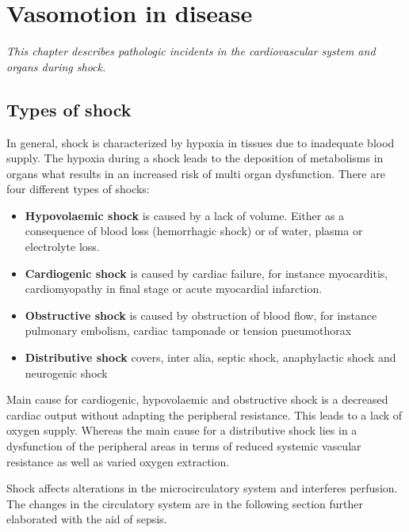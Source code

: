 \chapter{Vasomotion in disease}
\textit{This chapter describes pathologic incidents in the cardiovascular system and organs during shock.}

\section{Types of shock}
In general, shock is characterized by hypoxia in tissues due to inadequate blood supply. The hypoxia during a shock leads to the deposition of metabolisms in organs what results in an increased risk of multi organ dysfunction. 
There are four different types of shocks:\cite{lauridsen2015,vincent2013}
\begin{itemize}
	\item \textbf{Hypovolaemic shock} is caused by a lack of volume. Either as a consequence of blood loss (hemorrhagic shock) or of water, plasma or electrolyte loss.
	\item \textbf{Cardiogenic shock} is caused by cardiac failure, for instance myocarditis, cardiomyopathy in final stage or acute myocardial infarction.
	\item \textbf{Obstructive shock} is caused by obstruction of blood flow, for instance pulmonary embolism, cardiac tamponade or tension pneumothorax 
	\item \textbf{Distributive shock} covers, inter alia, septic shock, anaphylactic shock and neurogenic shock
\end{itemize}

Main cause for cardiogenic, hypovolaemic and obstructive shock is a decreased cardiac output without adapting the peripheral resistance. This leads to a lack of oxygen supply.
Whereas the main cause for a distributive shock lies in a dysfunction of the peripheral areas in terms of reduced systemic vascular resistance as well as varied oxygen extraction.\cite{vincent2013}

Shock affects alterations in the microcirculatory system and interferes perfusion\cite{maier2013}. The changes in the circulatory system are in the following section further elaborated with the aid of sepsis.